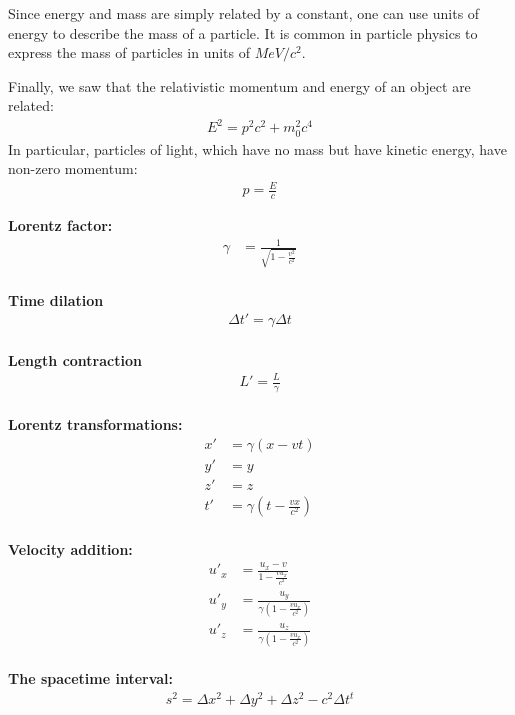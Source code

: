 \begin{chapterSummary}
Since energy and mass are simply related by a constant, one can use units of energy to describe the mass of a particle. It is common in particle physics to express the mass of particles in units of $\si{MeV/c^2}$.

Finally, we saw that the relativistic momentum and energy of an object are related:
\begin{align*}
E^2 = p^2c^2+m_0^2c^4
\end{align*}
In particular, particles of light, which have no mass but have kinetic energy, have non-zero momentum:
\begin{align*}
p=\frac{E}{c}
\end{align*}
\end{chapterSummary}

\begin{importantEquations}
\begin{multicols}{2}
\textbf{Lorentz factor:}
\begin{align*}
\gamma &= \frac{1}{\sqrt{1-\frac{v^2}{c^2}}}
\end{align*}
\\
\textbf{Time dilation}
\begin{align*}
\Delta t'=\gamma \Delta t
\end{align*}
\\
\textbf{Length contraction}
\begin{align*}
L'=\frac{L}{\gamma}
\end{align*}
\\
\textbf{Lorentz transformations:}
\begin{align*}
x' &=\gamma (x-vt)\\
y' &= y\\
z' &= z\\
t' &=\gamma\left(t-\frac{vx}{c^2} \right)
\end{align*}
\\
\textbf{Velocity addition:}
\begin{align*}
u'_x&=\frac{u_x -v}{1- \frac{vu_x}{c^2}}\\
u'_y &=\frac{u_y}{\gamma\left(1- \frac{vu_x}{c^2}\right)}\\
u'_z &=\frac{u_z}{\gamma\left(1- \frac{vu_x}{c^2}\right)}
\end{align*}
\\
\textbf{The spacetime interval:}
\begin{align*}
s^2 = \Delta x^2+\Delta y^2+\Delta z^2-c^2\Delta t^t
\end{align*}
\\
\columnbreak

\end{multicols}
\end{importantEquations}
